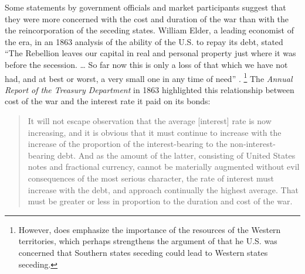 Some statements by government officials and market participants suggest that they were more concerned with the cost and duration of the war than with the the reincorporation of the seceding states.
William Elder, a leading economist of the era, in an 1863 analysis of the ability of the U.S. to repay its debt, stated ``The Rebellion leaves our capital in real and personal property just where it was before the secession. \dots{} So far now this is only a loss of that which we have not had, and at best or worst, a very small one in any time of need'' \parencite[19]{Elder1863}.%
\footnote{
  However, \textcite{Elder1863} does emphasize the importance of the resources of the Western territories, which perhaps strengthens the argument of  \textcite{Weingast1998} that he U.S. was concerned that Southern states seceding could lead to Western states seceding.
}
The \textit{Annual Report of the Treasury Department} in 1863 highlighted this relationship between cost of the war and the interest rate it paid on its bonds:
\begin{quote}
It will not escape observation that the average [interest] rate is now increasing, and it is obvious that it must continue to increase with the increase of the proportion of the interest-bearing to the non-interest-bearing debt.
And as the amount of the latter, consisting of United States notes and fractional currency, cannot be materially augmented without evil consequences of the most serious character, the rate of interest must increase with the debt, and approach continually the highest average.
That must be greater or less in proportion to the duration and cost of the war. \parencite[13]{Treasury1863}
\end{quote}

